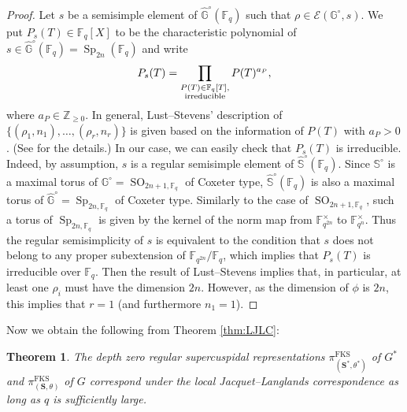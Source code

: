 \documentclass{amsart}
\newcommand{\FKS}{\mathrm{FKS}}
\newcommand{\Z}{\mathbb{Z}}
\newcommand{\F}{\mathbb{F}}
\newcommand{\bbS}{\mathbb{S}}
\newcommand{\bbG}{\mathbb{G}}
\newcommand{\bfS}{\mathbf{S}}
\DeclareMathOperator{\SO}{SO}
\DeclareMathOperator{\Sp}{Sp}
\theoremstyle{plain}
\newtheorem{thm}{Theorem}[section]
\theoremstyle{definition}
\theoremstyle{remark}
\theoremstyle{theorem}
\begin{document}
\begin{proof}
Let $s$ be a semisimple element of $\hat{\bbG}^{\circ}(\F_{q})$ such that $\rho\in\mathcal{E}(\bbG^{\circ},s)$.
We put $P_{s}(T)\in \F_{q}[X]$ to be the characteristic polynomial of $s\in \hat{\bbG}^{\circ}(\F_{q})=\Sp_{2n}(\F_{q})$ and write
\[
P_{s}(T)
=
\prod_{\begin{subarray}{c}P(T)\in \F_{q}[T], \\ \text{irreducible} \end{subarray}} P(T)^{a_{P}},
\]
where $a_{P}\in\Z_{\geq0}$.
In general, Lust--Stevens' description of $\{(\rho_{1},n_{1}),\ldots,(\rho_{r},n_{r})\}$ is given based on the information of $P(T)$ with $a_{P}>0$.
(See \cite[Section 9]{LS20} for the details.)
In our case, we can easily check that $P_{s}(T)$ is irreducible.
Indeed, by assumption, $s$ is a regular semisimple element of $\hat{\bbS}^{\circ}(\F_{q})$.
Since $\bbS^{\circ}$ is a maximal torus of $\bbG^{\circ}=\SO_{2n+1,\F_{q}}$ of Coxeter type, $\hat{\bbS}^{\circ}(\F_{q})$ is also a maximal torus of $\hat{\bbG}^{\circ}=\Sp_{2n,\F_{q}}$ of Coxeter type.
Similarly to the case of $\SO_{2n+1,\F_{q}}$, such a torus of $\Sp_{2n,\F_{q}}$ is given by the kernel of the norm map from $\F_{q^{2n}}^{\times}$ to $\F_{q^{n}}^{\times}$.
Thus the regular semisimplicity of $s$ is equivalent to the condition that $s$ does not belong to any proper subextension of $\F_{q^{2n}}/\F_{q}$, which implies that $P_{s}(T)$ is irreducible over $\F_{q}$.
Then the result of Lust--Stevens implies that, in particular, at least one $\rho_{i}$ must have the dimension $2n$.
However, as the dimension of $\phi$ is $2n$, this implies that $r=1$ (and furthermore $n_{1}=1$).
\end{proof}

Now we obtain the following from Theorem \ref{thm:LJLC}:

\begin{thm}\label{thm:LJLC-SO}
The depth zero regular supercuspidal representations $\pi^{\FKS}_{(\bfS^{\ast},\theta^{\ast})}$ of $G^{\ast}$ and $\pi^{\FKS}_{(\bfS,\theta)}$ of $G$ correspond under the local Jacquet--Langlands correspondence as long as $q$ is sufficiently large.
\end{thm}
\end{document}
